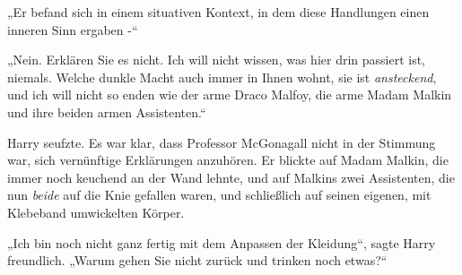 „Er befand sich in einem situativen Kontext, in dem diese Handlungen einen inneren Sinn ergaben -“

„Nein. Erklären Sie es nicht. Ich will nicht wissen, was hier drin passiert ist, niemals. Welche dunkle Macht auch immer in Ihnen wohnt, sie ist \emph{ansteckend}, und ich will nicht so enden wie der arme Draco Malfoy, die arme Madam Malkin und ihre beiden armen Assistenten.“

Harry seufzte. Es war klar, dass Professor McGonagall nicht in der Stimmung war, sich vernünftige Erklärungen anzuhören. Er blickte auf Madam Malkin, die immer noch keuchend an der Wand lehnte, und auf Malkins zwei Assistenten, die nun \emph{beide} auf die Knie gefallen waren, und schließlich auf seinen eigenen, mit Klebeband umwickelten Körper.

„Ich bin noch nicht ganz fertig mit dem Anpassen der Kleidung“, sagte Harry freundlich. „Warum gehen Sie nicht zurück und trinken noch etwas?“

